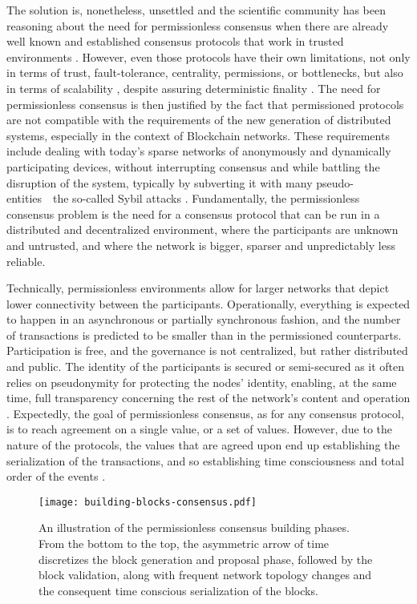 The solution is, nonetheless, unsettled and the scientific community has been reasoning about the need for permissionless consensus when there are already well known and established consensus protocols that work in trusted environments \cite{castro1999practical, miller2016honey}. However, even those protocols have their own limitations, not only in terms of trust, fault-tolerance, centrality, permissions, or bottlenecks, but also in terms of scalability \cite{miller2016honey}, despite assuring deterministic finality \cite{decker2016bitcoin}. The need for permissionless consensus is then justified by the fact that permissioned protocols are not compatible with the requirements of the new generation of distributed systems, especially in the context of Blockchain networks. These requirements include dealing with today's sparse networks of anonymously and dynamically participating devices, without interrupting consensus and while battling the disruption of the system, typically by subverting it with many pseudo-entities~\textemdash~the so-called Sybil attacks \cite{8629877, survey-dist-consensus}. Fundamentally, the permissionless consensus problem is the need for a consensus protocol that can be run in a distributed and decentralized environment, where the participants are unknown and untrusted, and where the network is bigger, sparser and unpredictably less reliable.

Technically, permissionless environments allow for larger networks that depict lower connectivity between the participants. Operationally, everything is expected to happen in an asynchronous or partially synchronous fashion, and the number of transactions is predicted to be smaller than in the permissioned counterparts. Participation is free, and the governance is not centralized, but rather distributed and public. The identity of the participants is secured or semi-secured as it often relies on pseudonymity for protecting the nodes' identity, enabling, at the same time, full transparency concerning the rest of the network's content and operation \cite{xiao2019distributed}. Expectedly, the goal of permissionless consensus, as for any consensus protocol, is to reach agreement on a single value, or a set of values. However, due to the nature of the protocols, the values that are agreed upon end up establishing the serialization of the transactions, and so establishing time consciousness and total order of the events \cite{8629877}.

\begin{figure}[ht]
  \begin{center}
  \texttt{[image: building-blocks-consensus.pdf]}
  \caption{An illustration of the permissionless consensus building phases. From the bottom to the top, the asymmetric arrow of time discretizes the block generation and proposal phase, followed by the block validation, along with frequent network topology changes and the consequent time conscious serialization of the blocks.}
  \label{fig:building-blocks-consensus}
  \end{center}
\end{figure}


